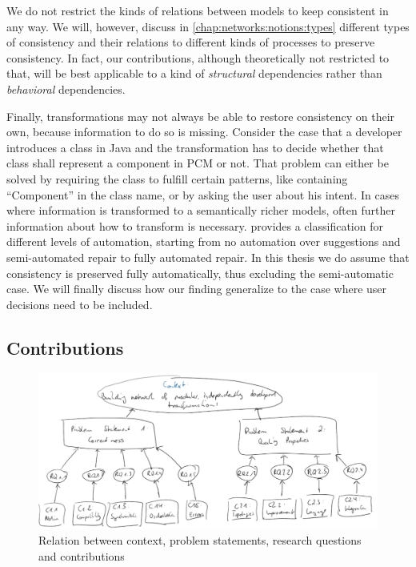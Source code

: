 We do not restrict the kinds of relations between models to keep consistent  in any way.
We will, however, discuss in \autoref{chap:networks:notions:types} different types of consistency and their relations to different kinds of processes to preserve consistency.
In fact, our contributions, although theoretically not restricted to that, will be best applicable to a kind of \emph{structural} dependencies rather than \emph{behavioral} dependencies.

Finally, transformations may not always be able to restore consistency on their own, because information to do so is missing.
Consider the case that a developer introduces a class in Java and the transformation has to decide whether that class shall represent a component in \gls{PCM} or not.
That problem can either be solved by requiring the class to fulfill certain patterns, like containing \enquote{Component} in the class name, or by asking the user about his intent.
In cases where information is transformed to a semantically richer models, often further information about how to transform is necessary.
\textcite[p. 57]{kramer2017a} provides a classification for different levels of automation, starting from no automation over suggestions and semi-automated repair to fully automated repair.
In this thesis we do assume that consistency is preserved fully automatically, thus excluding the semi-automatic case.
We will finally discuss how our finding generalize to the case where user decisions need to be included.



\subsection{Contributions}

\begin{figure}
    \centering
    \includegraphics[width=\textwidth]{figures/prologue/introduction/context_problem_eq_contribution_relations.png}
    \caption[Context, problems, research questions and contributions]{Relation between context, problem statements, research questions and contributions}
    \label{fig:introduction:context_problem_rq_contribution_relations}
\end{figure}

